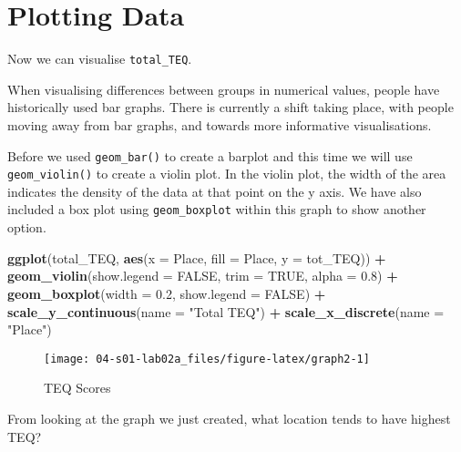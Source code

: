 \documentclass[]{book}
\newenvironment{Shaded}{\begin{snugshade}}{\end{snugshade}}
\newcommand{\DataTypeTok}[1]{\textcolor[rgb]{0.13,0.29,0.53}{#1}}
\newcommand{\FloatTok}[1]{\textcolor[rgb]{0.00,0.00,0.81}{#1}}
\newcommand{\KeywordTok}[1]{\textcolor[rgb]{0.13,0.29,0.53}{\textbf{#1}}}
\newcommand{\NormalTok}[1]{#1}
\newcommand{\OperatorTok}[1]{\textcolor[rgb]{0.81,0.36,0.00}{\textbf{#1}}}
\newcommand{\OtherTok}[1]{\textcolor[rgb]{0.56,0.35,0.01}{#1}}
\newcommand{\StringTok}[1]{\textcolor[rgb]{0.31,0.60,0.02}{#1}}
\begin{document}
\hypertarget{plotting-data}{%
\section{Plotting Data}\label{plotting-data}}

Now we can visualise \texttt{total\_TEQ}.

When visualising differences between groups in numerical values, people have historically used bar graphs. There is currently a shift taking place, with people moving away from bar graphs, and towards more informative visualisations.

Before we used \texttt{geom\_bar()} to create a barplot and this time we will use \texttt{geom\_violin()} to create a violin plot. In the violin plot, the width of the area indicates the density of the data at that point on the y axis. We have also included a box plot using \texttt{geom\_boxplot} within this graph to show another option.

\begin{Shaded}
\begin{Highlighting}[]
\KeywordTok{ggplot}\NormalTok{(total_TEQ, }\KeywordTok{aes}\NormalTok{(}\DataTypeTok{x =}\NormalTok{ Place, }\DataTypeTok{fill =}\NormalTok{ Place, }\DataTypeTok{y =}\NormalTok{ tot_TEQ)) }\OperatorTok{+}\StringTok{ }\KeywordTok{geom_violin}\NormalTok{(}\DataTypeTok{show.legend =} \OtherTok{FALSE}\NormalTok{, }\DataTypeTok{trim =} \OtherTok{TRUE}\NormalTok{, }\DataTypeTok{alpha =} \FloatTok{0.8}\NormalTok{) }\OperatorTok{+}
\StringTok{  }\KeywordTok{geom_boxplot}\NormalTok{(}\DataTypeTok{width =} \FloatTok{0.2}\NormalTok{, }\DataTypeTok{show.legend =} \OtherTok{FALSE}\NormalTok{) }\OperatorTok{+}
\StringTok{  }\KeywordTok{scale_y_continuous}\NormalTok{(}\DataTypeTok{name =} \StringTok{"Total TEQ"}\NormalTok{) }\OperatorTok{+}
\StringTok{  }\KeywordTok{scale_x_discrete}\NormalTok{(}\DataTypeTok{name =} \StringTok{"Place"}\NormalTok{)}
\end{Highlighting}
\end{Shaded}

\begin{figure}

{\centering \texttt{[image: 04-s01-lab02a\_files/figure-latex/graph2-1]} 

}

\caption{TEQ Scores}\label{fig:graph2}
\end{figure}

From looking at the graph we just created, what location tends to have highest TEQ?
\end{document}
